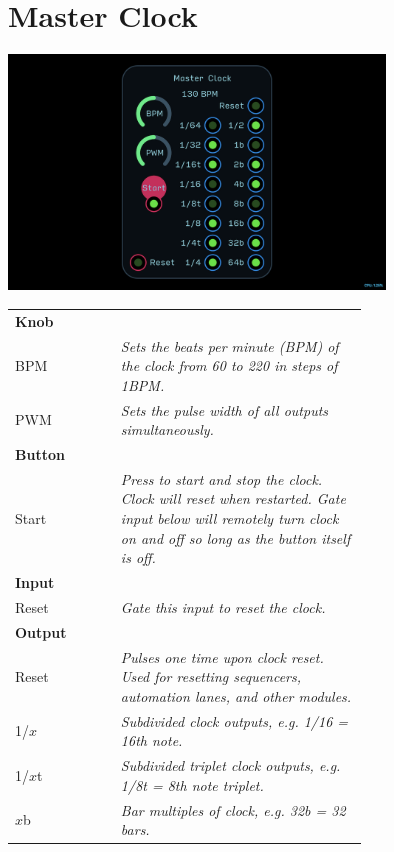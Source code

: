 \documentclass[11pt]{book}
\begin{document}
\pagebreak


\section{Master Clock}

\begin{center}
\includegraphics[width=0.75\textwidth]{master-clock.png}
\end{center}

\begin{table}[ht]
\small
\sffamily
\renewcommand\arraystretch{1.5}
\centering
\begin{tabular}{l*{1}{>{\raggedright\arraybackslash}p{0.7\linewidth}}}

\toprule
\textbf{Knob} \\
BPM & \textit{Sets the beats per minute (BPM) of the clock from 60 to 220 in steps of 1BPM.} \\
PWM & \textit{Sets the pulse width of all outputs simultaneously.} \\

\midrule
\textbf{Button} \\
Start & \textit{Press to start and stop the clock. Clock will reset when restarted. Gate input below will remotely turn clock on and off so long as the button itself is off.} \\

\midrule
\textbf{Input} \\
Reset & \textit{Gate this input to reset the clock.} \\

\midrule
\textbf{Output} \\
Reset & \textit{Pulses one time upon clock reset. Used for resetting sequencers, automation lanes, and other modules.} \\
1/$x$ & \textit{Subdivided clock outputs, e.g. 1/16 = 16th note.} \\
1/$x$t & \textit{Subdivided triplet clock outputs, e.g. 1/8t = 8th note triplet.} \\
$x$b & \textit{Bar multiples of clock, e.g. 32b = 32 bars.} \\

\bottomrule
\end{tabular}
\end{table}
\end{document}
